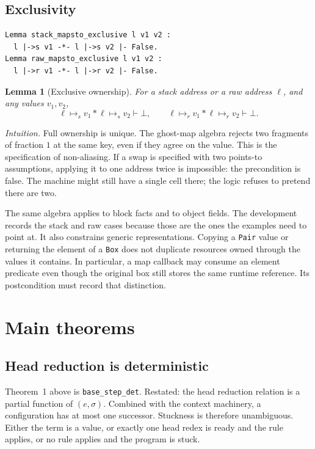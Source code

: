 \documentclass[11pt]{article}
\newtheorem{lemma}[theorem]{Lemma}
\newcommand{\ptss}{\mathrel{\mapsto_{s}}}
\newcommand{\ptsr}{\mathrel{\mapsto_{r}}}
\newcommand{\sep}{\mathbin{*}}
\begin{document}
\subsection{Exclusivity}

\begin{lstlisting}
Lemma stack_mapsto_exclusive l v1 v2 :
  l |->s v1 -*- l |->s v2 |- False.
Lemma raw_mapsto_exclusive l v1 v2 :
  l |->r v1 -*- l |->r v2 |- False.
\end{lstlisting}

\begin{lemma}[Exclusive ownership]
For a stack address or a raw address \(\ell\), and any values \(v_1,v_2\),
\[
\ell \ptss v_1 \sep \ell \ptss v_2 \vdash \bot,
\qquad
\ell \ptsr v_1 \sep \ell \ptsr v_2 \vdash \bot.
\]
\end{lemma}

\textit{Intuition.}
Full ownership is unique.
The ghost-map algebra rejects two fragments of fraction \(1\) at the same key, even if they agree on the value.
This is the specification of non-aliasing.
If a swap is specified with two points-to assumptions, applying it to one address twice is impossible: the precondition is false.
The machine might still have a single cell there; the logic refuses to pretend there are two.

The same algebra applies to block facts and to object fields.
The development records the stack and raw cases because those are the ones the examples need to point at.
It also constrains generic representations. Copying a \texttt{Pair} value
or returning the element of a \texttt{Box} does not duplicate resources
owned through the values it contains. In particular, a map callback may
consume an element predicate even though the original box still stores
the same runtime reference. Its postcondition must record that distinction.

\section{Main theorems}

\subsection{Head reduction is deterministic}

Theorem~1 above is \texttt{base\_step\_det}.
Restated: the head reduction relation is a partial function of \((e,\sigma)\).
Combined with the context machinery, a configuration has at most one successor.
Stuckness is therefore unambiguous.
Either the term is a value, or exactly one head redex is ready and the rule applies, or no rule applies and the program is stuck.
\end{document}
